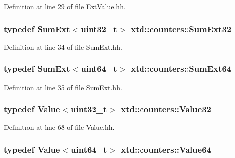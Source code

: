Definition at line 29 of file Ext\-Value.\-hh.

\hypertarget{namespacextd_1_1counters_a7e0abdd1fae0f70421c2e0ea3924db6f}{
\subsubsection[{Sum\-Ext32}]{\setlength{\rightskip}{0pt plus 5cm}typedef {\bf Sum\-Ext}$<$uint32\-\_\-t$>$ {\bf xtd\-::counters\-::\-Sum\-Ext32}}}\label{namespacextd_1_1counters_a7e0abdd1fae0f70421c2e0ea3924db6f}


Definition at line 34 of file Sum\-Ext.\-hh.

\hypertarget{namespacextd_1_1counters_a268d063d4f32d16f65c388b8791602e3}{
\subsubsection[{Sum\-Ext64}]{\setlength{\rightskip}{0pt plus 5cm}typedef {\bf Sum\-Ext}$<$uint64\-\_\-t$>$ {\bf xtd\-::counters\-::\-Sum\-Ext64}}}\label{namespacextd_1_1counters_a268d063d4f32d16f65c388b8791602e3}


Definition at line 35 of file Sum\-Ext.\-hh.

\hypertarget{namespacextd_1_1counters_ad10dfbcb762ad7dfc7199ab5a268bc6e}{
\subsubsection[{Value32}]{\setlength{\rightskip}{0pt plus 5cm}typedef {\bf Value}$<$uint32\-\_\-t$>$ {\bf xtd\-::counters\-::\-Value32}}}\label{namespacextd_1_1counters_ad10dfbcb762ad7dfc7199ab5a268bc6e}


Definition at line 68 of file Value.\-hh.

\hypertarget{namespacextd_1_1counters_a20cdfbbbf5aa96abb1c5d461497d1769}{
\subsubsection[{Value64}]{\setlength{\rightskip}{0pt plus 5cm}typedef {\bf Value}$<$uint64\-\_\-t$>$ {\bf xtd\-::counters\-::\-Value64}}}\label{namespacextd_1_1counters_a20cdfbbbf5aa96abb1c5d461497d1769}


